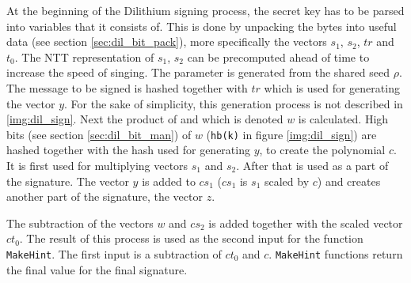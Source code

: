 At the beginning of the Dilithium signing process, the secret key has to be parsed into variables that it consists of. This is done by unpacking the bytes into useful data (see section \ref{sec:dil_bit_pack}), more specifically the vectors $s_1$, $s_2$, $tr$ and $t_0$. The NTT representation of $s_1$, $s_2$ can be precomputed ahead of time to increase the speed of singing. The parameter  is generated from the shared seed $\rho$. The message to be signed is hashed together with $tr$ which is used for generating the vector $y$. For the sake of simplicity, this generation process is not described in \ref{img:dil_sign}. Next the product of  and  which is denoted $w$ is calculated. High bits (see section \ref{sec:dil_bit_man}) of $w$ (\texttt{hb(k)} in figure \ref{img:dil_sign}) are hashed together with the hash used for generating $y$, to create the polynomial $c$. It is first used for multiplying vectors $s_1$ and $s_2$. After that is used as a part of the signature. The vector $y$ is added to $cs_1$ ($cs_1$ is $s_1$ scaled by $c$) and creates another part of the signature, the vector $z$.

The subtraction of the vectors $w$ and $cs_2$ is added together with the scaled vector $ct_0$. The result of this process is used as the second input for the function \texttt{MakeHint}. The first input is a subtraction of $ct_0$ and $c$. \texttt{MakeHint} functions return the final value for the final signature.

